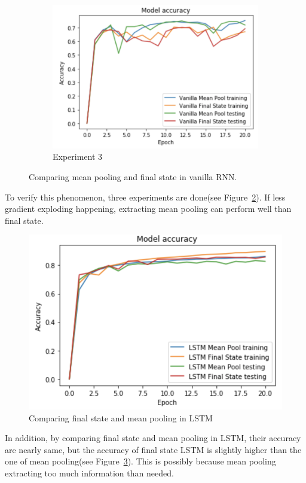 \documentclass[12pt,letterpaper]{article}
\begin{document}
\begin{figure}[h]
\begin{subfigure}{0.32\textwidth}
    \includegraphics[width=\linewidth]{vanilla_compare_final&meanpool_3.png}
    \caption{\small Experiment 3} \label{fig:f}
    \end{subfigure}
    \caption{Comparing mean pooling and final state in vanilla RNN.}
    \label{fig:3_experiments_Vanilla}
\end{figure}

To verify this phenomenon, three experiments are done(see Figure~\ref{fig:3_experiments_Vanilla}). If less gradient exploding happening, extracting mean pooling can perform well than final state.

\begin{figure}[h]
    \centering
    \includegraphics[width=.5\linewidth]{lstm_compare_final&meanpool.png}
    \caption{\small Comparing final state and mean pooling in LSTM}
    \label{fig:lstm_comparison}
\end{figure}

In addition, by comparing final state and mean pooling in LSTM, their accuracy are nearly same, but the accuracy of final state LSTM is slightly higher than the one of mean pooling(see Figure~\ref{fig:lstm_comparison}). This is possibly because mean pooling extracting too much information than needed.
\end{document}
